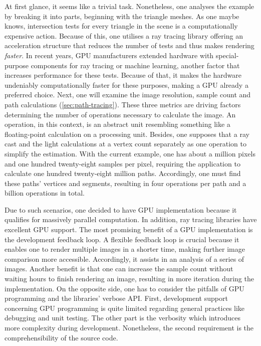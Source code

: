 At first glance, it seems like a trivial task.
Nonetheless, one analyses the example by breaking it into parts, beginning with the triangle meshes.
As one maybe knows, intersection tests for every triangle in the scene is a computationally expensive action.
Because of this, one utilises a ray tracing library offering an acceleration structure that reduces the number of tests and thus makes rendering \textit{faster}.
In recent years, GPU manufacturers extended hardware with special-purpose components for ray tracing or machine learning, another factor that increases performance for these tests.
Because of that, it makes the hardware undeniably computationally faster for these purposes, making a GPU already a preferred choice.
Next, one will examine the image resolution, sample count and path calculations (\ref{sec:path-tracing}).
These three metrics are driving factors determining the number of operations necessary to calculate the image.
An operation, in this context, is an abstract unit resembling something like a floating-point calculation on a processing unit.
Besides, one supposes that a ray cast and the light calculations at a vertex count separately as one operation to simplify the estimation.
With the current example, one has about a million pixels and one hundred twenty-eight samples per pixel, requiring the application to calculate one hundred twenty-eight million paths.
Accordingly, one must find these paths' vertices and segments, resulting in four operations per path and a billion operations in total.

Due to such scenarios, one decided to have GPU implementation because it qualifies for massively parallel computation.
In addition, ray tracing libraries have excellent GPU support.
The most promising benefit of a GPU implementation is the development feedback loop.
A flexible feedback loop is crucial because it enables one to render multiple images in a shorter time, making further image comparison more accessible.
Accordingly, it assists in an analysis of a series of images.
Another benefit is that one can increase the sample count without waiting hours to finish rendering an image, resulting in more iteration during the implementation.
On the opposite side, one has to consider the pitfalls of GPU programming and the libraries' verbose API.
First, development support concerning GPU programming is quite limited regarding general practices like debugging and unit testing.
The other part is the verbosity which introduces more complexity during development.
Nonetheless, the second requirement is the comprehensibility of the source code.

